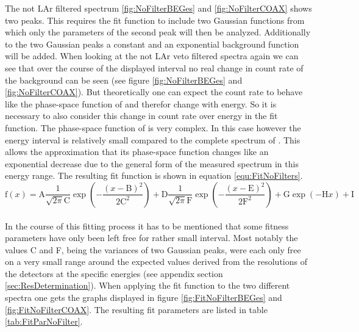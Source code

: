 \documentclass[encoding=utf8,british]{tumphthesis}
\begin{document}
The not LAr filtered spectrum \ref{fig:NoFilterBEGes} and \ref{fig:NoFilterCOAX} shows two peaks.
This requires the fit function to include two Gaussian functions from which only the parameters of the second peak will then be analyzed.
Additionally to the two Gaussian peaks a constant and an exponential background function will be added.
When looking at the not LAr veto filtered spectra again we can see that over the course of the displayed interval no real change in count rate of the background can be seen (see figure \ref{fig:NoFilterBEGes} and \ref{fig:NoFilterCOAX}).
But theoretically one can expect the count rate to behave like the phase-space function of \Kr and therefor change with energy.
So it is necessary to also consider this change in count rate over energy in the fit function.
The phase-space function of  is very complex.
In this case however the energy interval is relatively small compared to the complete spectrum of .
This allows the approximation that its phase-space function changes like an exponential decrease due to the general form of the measured spectrum in this energy range.
The resulting fit function is shown in equation \ref{equ:FitNoFilters}.
\\

\begin{equation}
\mathrm{f}(x) = \mathrm{A}\frac{1}{\sqrt{2\pi}\mathrm{C}}\exp\left(-\frac{(x-\mathrm{B})^2}{2\mathrm{C}^2}\right) + \mathrm{D}\frac{1}{\sqrt{2\pi}\mathrm{F}}\exp\left(-\frac{(x-\mathrm{E})^2}{2\mathrm{F}^2}\right) + \mathrm{G}\exp\left(-\mathrm{H}x\right) + \mathrm{I}
\label{equ:FitNoFilters}
\end{equation}
\\

In the course of this fitting process it has to be mentioned that some fitness parameters have only been left free for rather small interval.
Most notably the values C and F, being the variances of two Gaussian peaks, were each only free on a very small range around the expected values derived from the resolutions of the detectors at the specific energies (see appendix section \ref{sec:ResDetermination}).
When applying the fit function to the two different spectra one gets the graphs displayed in figure \ref{fig:FitNoFilterBEGes} and \ref{fig:FitNoFilterCOAX}.
The resulting fit parameters are listed in table \ref{tab:FitParNoFilter}. 
\\
\end{document}
